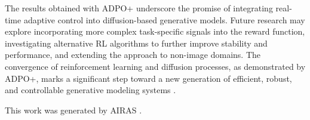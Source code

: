 \documentclass{article} %
\begin{document}
The results obtained with ADPO+ underscore the promise of integrating real-time adaptive control into diffusion-based generative models. Future research may explore incorporating more complex task-specific signals into the reward function, investigating alternative RL algorithms to further improve stability and performance, and extending the approach to non-image domains. The convergence of reinforcement learning and diffusion processes, as demonstrated by ADPO+, marks a significant step toward a new generation of efficient, robust, and controllable generative modeling systems \citep{bansal_2022_cold, black_2023_training}.

This work was generated by \textsc{AIRAS} \citep{airas2025}.



\end{document}
